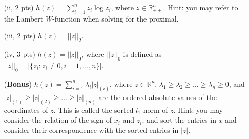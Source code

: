 \documentclass{article}
\theoremstyle{remark}
\theoremstyle{definition}
\def\R{\mathbb{R}}
\begin{document}
\begin{enumerate}[(a)]
\begin{enumerate}
                \item[(ii, 2 pts)]  $h(z) = \sum_{i=1}^n z_i \log z_i$, where $z\in\R_{++}^n$.
                Hint: you may refer to the Lambert $W$-function when solving for the proximal.

                \item[(iii, 2 pts)] $h(z) = ||z||_2$.

                \item[(iv, 3 pts)] $h(z) = ||z||_0$, where $||z||_0$ is defined as $||z||_0 = |\{z_i: z_i \neq 0, i = 1,\ldots, n\}|$.
                
                \item[(\textbf{Bonus})] $h(z) = \sum_{i=1}^{n}\lambda_i |z|_{(i)}$, where $z \in \mathbb{R}^n$, $\lambda_1 \geq  \lambda_2 \geq \ldots \geq \lambda_n \geq 0$, and $|z|_{(1)} \geq |z|_{(2)} \geq \ldots \geq |z|_{(n)}$ are the ordered absolute values of the coordinates of $z$. This is called the sorted-$l_1$ norm of $z$.
                Hint: you may consider the relation of the sign of $x_i$ and $z_i$; and sort the entries in $x$ and consider their correspondence with the sorted entries in $|z|$.
            \end{enumerate}
\end{enumerate}
\end{document}
